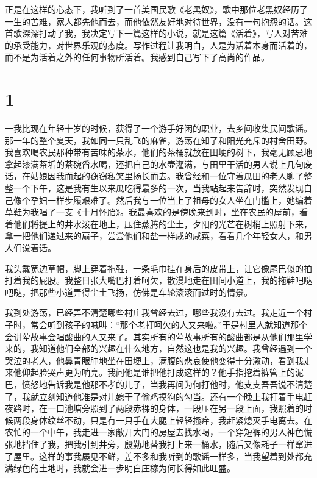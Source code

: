 \documentclass[12pt,UTF8]{ctexbook}
\begin{document}
正是在这样的心态下，我听到了一首美国民歌《老黑奴》，歌中那位老黑奴经历了一生的苦难，家人都先他而去，而他依然友好地对待世界，没有一句抱怨的话。这首歌深深打动了我，我决定写下一篇这样的小说，就是这篇《活着》，写人对苦难的承受能力，对世界乐观的态度。写作过程让我明白，人是为活着本身而活着的，而不是为活着之外的任何事物所活着。我感到自己写下了高尚的作品。

\mainmatter

\chapter{1}

一我比现在年轻十岁的时候，获得了一个游手好闲的职业，去乡间收集民间歌谣。那一年的整个夏天，我如同一只乱飞的麻雀，游荡在知了和阳光充斥的村舍田野。我喜欢喝农民那种带有苦味的茶水，他们的茶桶就放在田埂的树下，我毫无顾忌地拿起漆满茶垢的茶碗舀水喝，还把自己的水壶灌满，与田里干活的男人说上几句废话，在姑娘因我而起的窃窃私笑里扬长而去。我曾经和一位守着瓜田的老人聊了整整一个下午，这是我有生以来瓜吃得最多的一次，当我站起来告辞时，突然发现自己像个孕妇一样步履艰难了。然后我与一位当上了祖母的女人坐在门槛上，她编着草鞋为我唱了一支《十月怀胎》。我最喜欢的是傍晚来到时，坐在农民的屋前，看着他们将提上的井水泼在地上，压住蒸腾的尘土，夕阳的光芒在树梢上照射下来，拿一把他们递过来的扇子，尝尝他们和盐一样咸的咸菜，看看几个年轻女人，和男人们说着话。

我头戴宽边草帽，脚上穿着拖鞋，一条毛巾挂在身后的皮带上，让它像尾巴似的拍打着我的屁股。我整日张大嘴巴打着呵欠，散漫地走在田间小道上，我的拖鞋吧哒吧哒，把那些小道弄得尘土飞扬，仿佛是车轮滚滚而过时的情景。

我到处游荡，已经弄不清楚哪些村庄我曾经去过，哪些我没有去过。我走近一个村子时，常会听到孩子的喊叫：“那个老打呵欠的人又来啦。”于是村里人就知道那个会讲荤故事会唱酸曲的人又来了。其实所有的荤故事所有的酸曲都是从他们那里学来的，我知道他们全部的兴趣在什么地方，自然这也是我的兴趣。我曾经遇到一个哭泣的老人，他鼻青眼肿地坐在田埂上，满腹的悲哀使他变得十分激动，看到我走来他仰起脸哭声更为响亮。我问他是谁把他打成这样的？他手指挖着裤管上的泥巴，愤怒地告诉我是他那不孝的儿子，当我再问为何打他时，他支支吾吾说不清楚了，我就立刻知道他准是对儿媳干了偷鸡摸狗的勾当。还有一个晚上我打着手电赶夜路时，在一口池塘旁照到了两段赤裸的身体，一段压在另一段上面，我照着的时候两段身体纹丝不动，只是有一只手在大腿上轻轻搔痒，我赶紧熄灭手电离去。在农忙的一个中午，我走进一家敞开大门的房屋去找水喝，一个穿短裤的男人神色慌张地挡住了我，把我引到井旁，殷勤地替我打上来一桶水，随后又像耗子一样窜进了屋里。这样的事我屡见不鲜，差不多和我听到的歌谣一样多，当我望着到处都充满绿色的土地时，我就会进一步明白庄稼为何长得如此旺盛。
\end{document}
